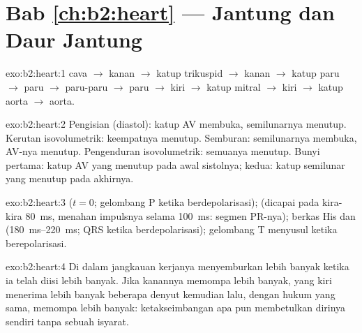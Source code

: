 \section*{Bab \ref{ch:b2:heart} --- Jantung dan Daur Jantung}

\begin{solution}{exo:b2:heart:1}
 cava $\to$  kanan $\to$ katup trikuspid $\to$ 
kanan $\to$ katup paru $\to$  paru $\to$ paru-paru
$\to$  paru $\to$  kiri $\to$ katup mitral $\to$ 
kiri $\to$ katup aorta $\to$ aorta.
\end{solution}

\begin{solution}{exo:b2:heart:2}
Pengisian (diastol): katup AV membuka, semilunarnya menutup. Kerutan
isovolumetrik: keempatnya menutup. Semburan: semilunarnya membuka,
AV-nya menutup. Pengenduran isovolumetrik: semuanya menutup. Bunyi
pertama: katup AV yang menutup pada awal sistolnya; kedua: katup
semilunar yang menutup pada akhirnya.
\end{solution}

\begin{solution}{exo:b2:heart:3}
 ($t = 0$; gelombang P ketika 
berdepolarisasi);  (dicapai pada kira-kira
\qty{80}{ms}, menahan impulsnya selama \qty{100}{ms}: segmen PR-nya);
berkas His dan  (\qtyrange{180}{220}{ms}; QRS ketika
 berdepolarisasi); gelombang T menyusul ketika 
berepolarisasi.
\end{solution}

\begin{solution}{exo:b2:heart:4}
Di dalam jangkauan kerjanya  menyemburkan lebih banyak ketika
ia telah diisi lebih banyak. Jika  kanannya memompa lebih banyak,
yang kiri menerima lebih banyak beberapa denyut kemudian lalu, dengan
hukum yang sama, memompa lebih banyak: ketakseimbangan apa pun
membetulkan dirinya sendiri tanpa sebuah isyarat.
\end{solution}

